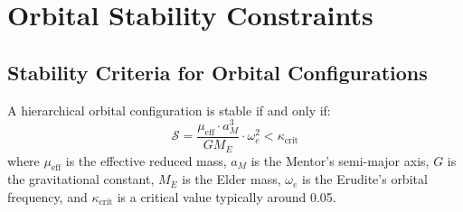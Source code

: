 \section{Orbital Stability Constraints}

\subsection{Stability Criteria for Orbital Configurations}

\begin{theorem}
A hierarchical orbital configuration is stable if and only if:
\begin{equation}
\mathcal{S} = \frac{\mu_{\text{eff}} \cdot a_M^3}{GM_E} \cdot \omega_e^2 < \kappa_{\text{crit}}
\end{equation}
where $\mu_{\text{eff}}$ is the effective reduced mass, $a_M$ is the Mentor's semi-major axis, $G$ is the gravitational constant, $M_E$ is the Elder mass, $\omega_e$ is the Erudite's orbital frequency, and $\kappa_{\text{crit}}$ is a critical value typically around 0.05.
\end{theorem}

